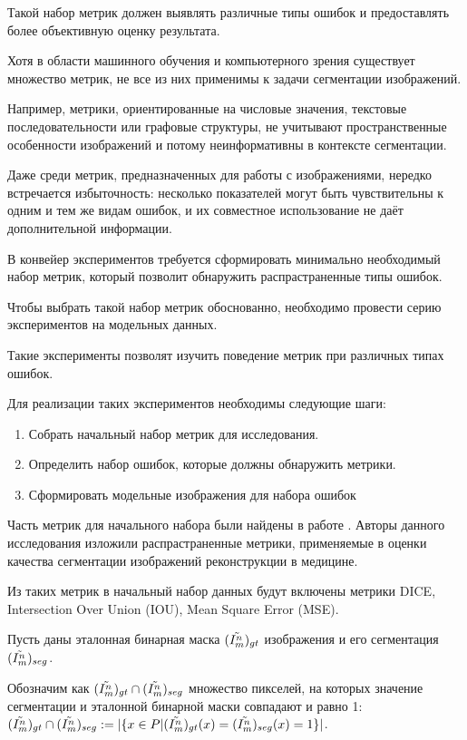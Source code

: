 Такой набор метрик должен выявлять различные типы ошибок и предоставлять более объективную оценку результата.

Хотя в области машинного обучения и компьютерного зрения существует множество метрик, не все из них применимы к задачи сегментации изображений. 

Например, метрики, ориентированные на числовые значения, текстовые последовательности или графовые структуры, не учитывают пространственные особенности изображений и потому неинформативны в контексте сегментации.

Даже среди метрик, предназначенных для работы с изображениями, нередко встречается избыточность: несколько показателей могут быть чувствительны к одним и тем же видам ошибок, и их совместное использование не даёт дополнительной информации.

В конвейер экспериментов требуется сформировать минимально необходимый набор  метрик, который позволит обнаружить распрастраненные типы ошибок.

Чтобы выбрать такой набор метрик обоснованно, необходимо провести серию экспериментов на модельных данных.

Такие эксперименты позволят изучить поведение метрик при различных типах ошибок.

Для реализации таких экспериментов необходимы следующие шаги:

\begin{enumerate}
    \item Собрать начальный набор метрик для исследования.
    \item Определить набор ошибок, которые должны обнаружить метрики.
    \item Сформировать модельные изображения для набора ошибок
\end{enumerate}

Часть метрик для начального набора были найдены в работе \cite{taha2015metrics}. Авторы данного исследования изложили распрастраненные метрики, применяемые в оценки качества сегментации изображений реконструкции в медицине.

Из таких метрик в начальный набор данных будут включены метрики DICE, Intersection Over Union (IOU), Mean Square Error (MSE).

Пусть даны эталонная бинарная маска \((\tilde{I^n_m})_{gt}\) изображения и его сегментация \((\tilde{I^n_m})_{seg}\).

Обозначим как \((\tilde{I^n_m})_{gt} \cap (\tilde{I^n_m})_{seg}\) множество пикселей, на которых значение сегментации и эталонной бинарной маски совпадают и равно 1: \((\tilde{I^n_m})_{gt} \cap (\tilde{I^n_m})_{seg} := |\{x \in P | (\tilde{I^n_m})_{gt}(x) = (\tilde{I^n_m})_{seg}(x) = 1 \}|\).

